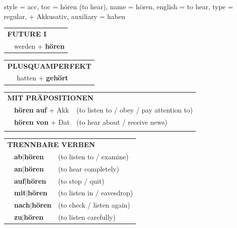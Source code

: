 \begin{verbentry}{
  style = {acc},
  toc = {hören (to hear)},
  name = {hören},
  english = {to hear},
  type = {regular, + Akkusativ},
  auxiliary = {haben}
}
\begin{tabular}{rl}
    \multicolumn{2}{l}{\textbf{FUTURE I} }\\
    &werden + \textbf{hören}\\
 
  \end{tabular}
\hfill
   \begin{tabular}{rl}
      \multicolumn{2}{l}{\textbf{PLUSQUAMPERFEKT}}\\
    &hatten + \textbf{gehört}\\
  \end{tabular}
  

  \vspace{10pt}

   \begin{tabular}{lll}
      \multicolumn{3}{l}{\textbf{MIT PRÄPOSITIONEN}}\\
& \textbf{hören auf} + Akk & (to listen to / obey / pay attention to)\\
& \textbf{hören von} + Dat & (to hear about / receive news)\\
\vspace{30pt}
  \end{tabular}
  \hfill
   \begin{tabular}{lll}
      \multicolumn{3}{l}{\textbf{TRENNBARE VERBEN}}\\
 & \textbf{ab$|$hören} & (to listen to / examine)\\
 & \textbf{an$|$hören} & (to hear completely)\\
 & \textbf{auf$|$hören} & (to stop / quit)\\
  & \textbf{mit$|$hören} & (to listen in / eavesdrop)\\
  & \textbf{nach$|$hören} & (to check / listen again)\\
   & \textbf{zu$|$hören} & (to listen carefully)\\
  \end{tabular}

  \vspace{-5pt}
\end{verbentry}

